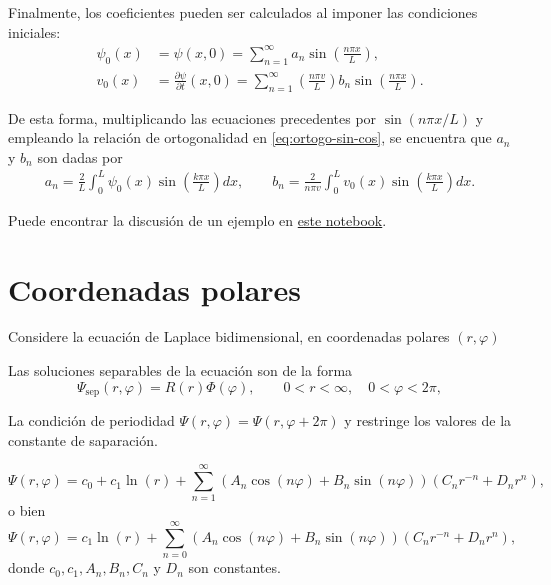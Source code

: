 Finalmente, los coeficientes pueden ser calculados al imponer las condiciones iniciales:
\begin{align}
    \psi_{0}(x) & = \psi(x,0)=\sum_{n=1}^{\infty}a_{n}\sin\left(\frac{n \pi x}{L}\right),\label{eq:psi0}                                                            \\
    v_{0}(x)    & = \frac{\partial \psi}{\partial t}(x,0)=\sum_{n=1}^{\infty}\left( \frac{n \pi v}{L}\right) b_{n}\sin\left( \frac{n \pi x}{L}\right).\label{eq:v0}
\end{align}

De esta forma, multiplicando las ecuaciones precedentes por $\sin(n\pi x/L)$ y empleando la relación de ortogonalidad en \eqref{eq:ortogo-sin-cos}, se encuentra que $a_{n}$ y $b_{n}$ son dadas por
\begin{align}
    a_{n}=\frac{2}{L}\int_{0}^{L} \psi_{0}(x)\sin\left(\frac{k\pi x}{L}\right)dx, \qquad
    b_{n}=\frac{2}{n \pi v}\int_{0}^{L} v_{0}(x)\sin\left(\frac{k\pi x}{L}\right)dx.
\end{align}

Puede encontrar la discusión de un ejemplo en \href{https://github.com/gfrubi/FM2/blob/master/Notebooks/Ejemplo-MSV-Ecuacion-Onda-1D.ipynb}{este notebook}.

\section{Coordenadas polares}

Considere la ecuación de Laplace bidimensional, en coordenadas polares $(r,\varphi)$

Las soluciones separables de la ecuación son de la forma
\begin{equation}
    \Psi_\text{sep}(r,\varphi)=R(r)\Phi(\varphi), \qquad 0<r<\infty, \quad 0<\varphi<2\pi,
\end{equation}

La condición de periodidad $\Psi(r,\varphi)=\Psi(r,\varphi+2\pi)$ y restringe los valores de la constante de saparación.

\begin{equation}
    \Psi(r,\varphi)=c_0+c_1\ln(r)+\sum_{n=1}^\infty\left(A_n\cos(n\varphi)+B_n\sin(n\varphi)\right)
    \left(C_nr^{-n}+D_nr^n\right),
\end{equation}
o bien
\begin{equation}
    \Psi(r,\varphi)=c_1\ln(r)+\sum_{n=0}^\infty\left(A_n\cos(n\varphi)+B_n\sin(n\varphi)\right)
    \left(C_nr^{-n}+D_nr^n\right),
\end{equation}
donde $c_0,c_1,A_n,B_n,C_n$ y $D_n$ son constantes.

